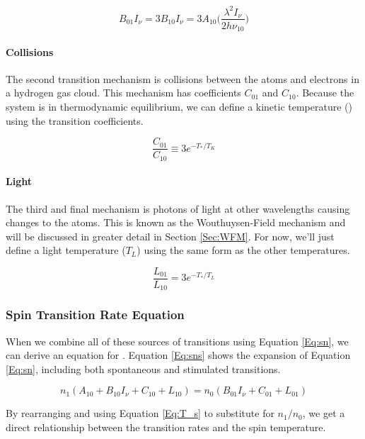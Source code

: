 \begin{equation} \label{Eq:Bxx}
B_{01} I_{\nu} = 3 B_{10} I_{\nu} = 3 A_{10} \Big( \frac{\lambda^2 I_\nu}{ 2 h \nu_{10}} \Big)
\end{equation}

\paragraph{Collisions}
The second transition mechanism is collisions between the atoms and electrons in a hydrogen gas cloud. This mechanism has coefficients $C_{01}$ and $C_{10}$. Because the system is in thermodynamic equilibrium, we can define a kinetic temperature (\tk) using the transition coefficients. 

\begin{equation}
\frac{C_{01}}{C_{10}} \equiv 3 e^{-T_*/T_K}
\end{equation}

\paragraph{Light}
The third and final mechanism is photons of light at other wavelengths causing changes to the atoms. This is known as the Wouthuysen-Field mechanism \cite{wouthuysen_1952}\cite{field_1958} and will be discussed in greater detail in Section \ref{Sec:WFM}. For now, we'll just define a light temperature ($T_L$) using the same form as the other temperatures.

\begin{equation}
\frac{L_{01}}{L_{10}} = 3 e^{-T_*/T_L}
\end{equation}

\subsubsection{Spin Transition Rate Equation}
When we combine all of these sources of transitions using Equation \ref{Eq:sn}, we can derive an equation for \ts. Equation \ref{Eq:sns} shows the expansion of Equation \ref{Eq:sn}, including both spontaneous and stimulated transitions. 

\begin{equation}\label{Eq:sns}
n_1(A_{10} + B_{10} I_\nu + C_{10} + L_{10}) = n_0 (B_{01} I_\nu + C_{01} + L_{01})
\end{equation}

By rearranging and using Equation \ref{Eq:T_s} to substitute for $n_1/n_0$, we get a direct relationship between the transition rates and the spin temperature. 

